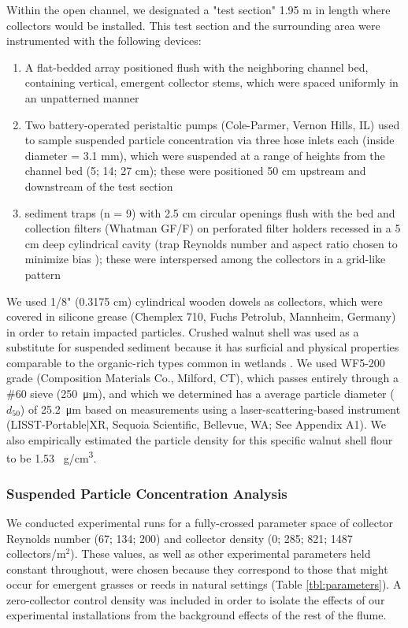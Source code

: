 \documentclass[geosciences,article,submit,moreauthors,pdftex]{Definitions/mdpi}
\begin{document}
Within the open channel, we designated a "test section" 1.95 m in length where collectors would be installed. This test section and the surrounding area were instrumented with the following devices:
\begin{enumerate}
     \item A flat-bedded array positioned flush with the neighboring channel bed, containing vertical, emergent collector stems, which were spaced uniformly in an unpatterned manner
    \item Two battery-operated peristaltic pumps (Cole-Parmer, Vernon Hills, IL) used to sample suspended particle concentration via three hose inlets each (inside diameter = 3.1 mm), which were suspended at a range of heights from the channel bed (5; 14; 27 cm); these were positioned 50 cm upstream and downstream of the test section 
   \item sediment traps (n = 9) with 2.5 cm circular openings flush with the bed and collection filters (Whatman GF/F) on perforated filter holders recessed in a 5 cm deep cylindrical cavity (trap Reynolds number and aspect ratio chosen to minimize bias \cite{butman1986sediment}); these were interspersed among the collectors in a grid-like pattern
\end{enumerate}

We used 1/8" (0.3175 cm) cylindrical wooden dowels as collectors, which were covered in silicone grease (Chemplex 710, Fuchs Petrolub, Mannheim, Germany) in order to retain impacted particles. Crushed walnut shell was used as a substitute for suspended sediment because it has surficial and physical properties comparable to the organic-rich types common in wetlands \cite{muller2017experiments, jenzer2015sediment, redding2006particle}. We used WF5-200 grade (Composition Materials Co., Milford, CT), which passes entirely through a \#60 sieve (\SI{250}{\micro\metre}), and which we determined has a average particle diameter ($d_{50}$) of \SI{25.2}{\micro\metre} based on measurements using a laser-scattering-based instrument (LISST-Portable|XR, Sequoia Scientific, Bellevue, WA; See Appendix A1). We also empirically estimated the particle density for this specific walnut shell flour to be 1.53 \SI{}{\gram/\centi\metre\cubed}.

\subsubsection{Suspended Particle Concentration Analysis}

We conducted experimental runs for a fully-crossed parameter space of collector Reynolds number (67; 134; 200) and collector density (0; 285; 821; 1487 collectors/m$^2$). These values, as well as other experimental parameters held constant throughout, were chosen because they correspond to those that might occur for emergent grasses or reeds in natural settings (Table \ref{tbl:parameters}). A zero-collector control density was included in order to isolate the effects of our experimental installations from the background effects of the rest of the flume.   
\end{document}
